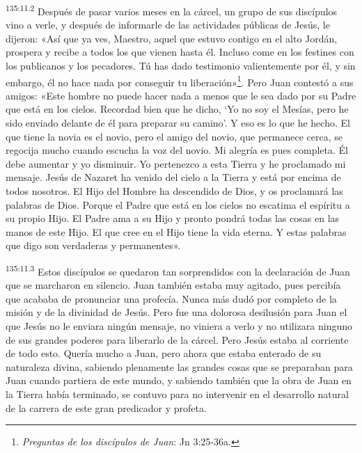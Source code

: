 \par 
\textsuperscript{135:11.2} Después de pasar varios meses en la cárcel, un grupo de sus discípulos vino a verle, y después de informarle de las actividades públicas de Jesús, le dijeron: «Así que ya ves, Maestro, aquel que estuvo contigo en el alto Jordán, prospera y recibe a todos los que vienen hasta él. Incluso come en los festines con los publicanos y los pecadores. Tú has dado testimonio valientemente por él, y sin embargo, él no hace nada por conseguir tu liberación»\footnote{\textit{Preguntas de los discípulos de Juan}: Jn 3:25-36a.}. Pero Juan contestó a sus amigos: «Este hombre no puede hacer nada a menos que le sea dado por su Padre que está en los cielos. Recordad bien que he dicho, `Yo no soy el Mesías, pero he sido enviado delante de él para preparar su camino'. Y eso es lo que he hecho. El que tiene la novia es el novio, pero el amigo del novio, que permanece cerca, se regocija mucho cuando escucha la voz del novio. Mi alegría es pues completa. Él debe aumentar y yo disminuir. Yo pertenezco a esta Tierra y he proclamado mi mensaje. Jesús de Nazaret ha venido del cielo a la Tierra y está por encima de todos nosotros. El Hijo del Hombre ha descendido de Dios, y os proclamará las palabras de Dios. Porque el Padre que está en los cielos no escatima el espíritu a su propio Hijo. El Padre ama a su Hijo y pronto pondrá todas las cosas en las manos de este Hijo. El que cree en el Hijo tiene la vida eterna. Y estas palabras que digo son verdaderas y permanentes».

\par 
\textsuperscript{135:11.3} Estos discípulos se quedaron tan sorprendidos con la declaración de Juan que se marcharon en silencio. Juan también estaba muy agitado, pues percibía que acababa de pronunciar una profecía. Nunca más dudó por completo de la misión y de la divinidad de Jesús. Pero fue una dolorosa desilusión para Juan el que Jesús no le enviara ningún mensaje, no viniera a verlo y no utilizara ninguno de sus grandes poderes para liberarlo de la cárcel. Pero Jesús estaba al corriente de todo esto. Quería mucho a Juan, pero ahora que estaba enterado de su naturaleza divina, sabiendo plenamente las grandes cosas que se preparaban para Juan cuando partiera de este mundo, y sabiendo también que la obra de Juan en la Tierra había terminado, se contuvo para no intervenir en el desarrollo natural de la carrera de este gran predicador y profeta.

